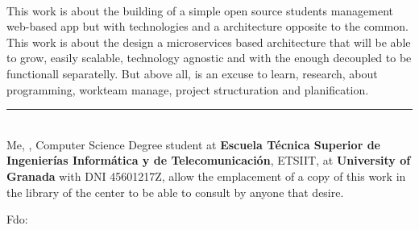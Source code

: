 \chapter*{}


\cleardoublepage
\thispagestyle{empty}

\begin{center}
{\large\bfseries \myTitle}\\
\end{center}
\begin{center}
\myName\\
\end{center}

\\

\vspace{0.7cm}
\\

This work is about the building of a simple  open source students management
web-based app but with technologies and a architecture opposite to the common.
This work is about the design a microservices based architecture that will be
able to grow, easily scalable, technology agnostic and with the enough decoupled
to be functionall separatelly. But above all, is an excuse to learn, research,
about programming, workteam manage, project structuration and planification.
\cleardoublepage

\thispagestyle{empty}

\noindent\rule[-1ex]{\textwidth}{2pt}\\[4.5ex]


Me, \textbf{\myName}, Computer Science Degree student at
\textbf{Escuela Técnica Superior de Ingenierías Informática y de Telecomunicación},
ETSIIT, at \textbf{University of Granada} with DNI 45601217Z, allow the emplacement of a copy
of this work in the library of the center to be able to consult by anyone that desire.

\vspace{6cm}

\noindent Fdo: \myName

\vspace{2cm}

\begin{flushright}
\myDate %
\end{flushright}

